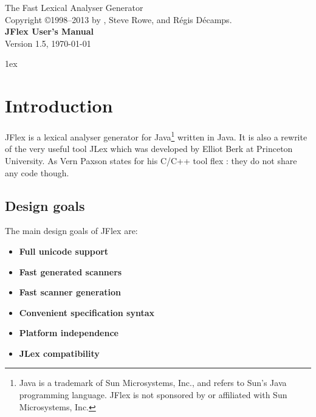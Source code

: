 \documentclass[11pt]{scrartcl}
\newcommand{\ver}{1.5}
\begin{document}


\begin{center}
\sffamily
{\Large The Fast Lexical Analyser Generator}\\
\smallskip\smallskip
Copyright \copyright 1998--2013 by ,
Steve Rowe, and R\'egis D\'ecamps.
\\
\bigskip
{\Huge \sffamily \bfseries JFlex User's Manual}\\
\bigskip
Version \ver, {\today}
\end{center}

\tableofcontents
\vfill
\newpage
\parindent0pt\parskip1ex
\pagestyle{headings}
\section{Introduction\label{Intro}}
JFlex is a lexical analyser generator for Java\footnote{Java is a trademark of 
Sun Microsystems, Inc., and refers to Sun's Java programming language. 
JFlex is not sponsored by or affiliated with Sun Microsystems, Inc.}
written in Java. It is also a rewrite of the very useful tool JLex \cite{JLex} which
was developed by Elliot Berk at Princeton University. As Vern Paxson states
for his C/C++ tool flex \cite{flex}: they do not share any code though.

\subsection{Design goals}
The main design goals of JFlex are:
\begin{itemize}
\item {\bf Full unicode support}
\item {\bf Fast generated scanners }
\item {\bf Fast scanner generation}
\item {\bf Convenient specification syntax}
\item {\bf Platform independence}
\item {\bf JLex compatibility}
\end{itemize}
\end{document}

